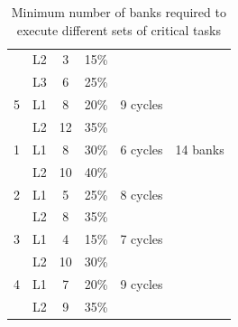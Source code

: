 \begin{table}[!htb]
\begin{tabular}{|c|c|c|c|c|c|}
   & L2 & 3 & 15\% & & \\
   & L3 & 6 & 25\% & & \\ 
 5 & L1 & 8 & 20\% & 9 cycles & \\
   & L2 & 12 & 35\% & & \\ \hline 
 1 & L1 & 8 & 30\% & 6 cycles & 14 banks\\
   & L2 & 10 & 40\% & & \\
 2 & L1 & 5 & 25\% & 8 cycles & \\ 
   & L2 & 8 & 35\% &  & \\
 3 & L1 & 4 & 15\% & 7 cycles &  \\ 
   & L2 & 10 & 30\% & & \\ 
 4 & L1 & 7 & 20\% & 9 cycles & \\
   & L2 & 9 & 35\% &  & \\ \hline
   
\end{tabular}
\caption{Minimum number of banks required to execute different sets of critical tasks}
\label{tab2}
\end{table}

 
 
 
 
